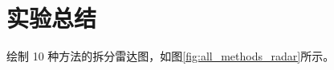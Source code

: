 \documentclass[bachelor, vlined]{DissertUESTC}
\begin{document}
    \section{实验总结}
    绘制 10 种方法的拆分雷达图，如图\ref{fig:all_methods_radar}所示。

    \newcommand{\methodradar}[3]{
    \begin{minipage}{0.31\linewidth}
        \centering
        \textbf{#1}\par\vspace{0.25em}
        \begin{tikzpicture}
        \begin{polaraxis}[
            width=0.8\linewidth,
            height=0.15\textheight,
            ymin=0,
            ymax=100,
            ytick={20,40,60,80,100},
            yticklabels={,,,,},
            xtick={0,90,180,270},
            xticklabels={Acc.,Prec.,FDR,F1},
            grid=both,
            minor grid style={gray!20},
            major grid style={gray!40},
            tick label style={font=\normalsize},
            xticklabel style={font=\normalsize},
            yticklabel style={font=\normalsize},
            clip=false
        ]
            \addplot+[
                #2,
                thick,
                mark=*,
                mark size=1.2pt,
                fill=#2,
                fill opacity=0.12
            ] coordinates {#3};
        \end{polaraxis}
        \end{tikzpicture}
    \end{minipage}
    }
\end{document}
